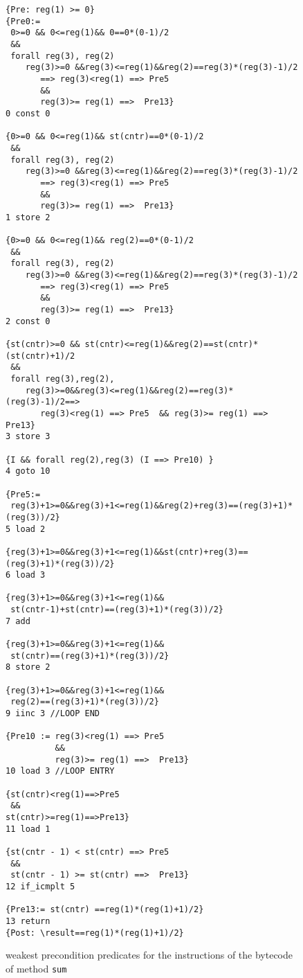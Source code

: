 \begin{figure}
{\scriptsize
\begin{lstlisting}[frame=trbl]
{Pre: reg(1) >= 0}
{Pre0:= 
 0>=0 && 0<=reg(1)&& 0==0*(0-1)/2
 && 
 forall reg(3), reg(2)
    reg(3)>=0 &&reg(3)<=reg(1)&&reg(2)==reg(3)*(reg(3)-1)/2
       ==> reg(3)<reg(1) ==> Pre5 
       &&
       reg(3)>= reg(1) ==>  Pre13}
0 const 0

{0>=0 && 0<=reg(1)&& st(cntr)==0*(0-1)/2
 && 
 forall reg(3), reg(2)
    reg(3)>=0 &&reg(3)<=reg(1)&&reg(2)==reg(3)*(reg(3)-1)/2
       ==> reg(3)<reg(1) ==> Pre5 
       &&
       reg(3)>= reg(1) ==>  Pre13}
1 store 2

{0>=0 && 0<=reg(1)&& reg(2)==0*(0-1)/2
 && 
 forall reg(3), reg(2)
    reg(3)>=0 &&reg(3)<=reg(1)&&reg(2)==reg(3)*(reg(3)-1)/2
       ==> reg(3)<reg(1) ==> Pre5 
       &&
       reg(3)>= reg(1) ==>  Pre13}
2 const 0

{st(cntr)>=0 && st(cntr)<=reg(1)&&reg(2)==st(cntr)*(st(cntr)+1)/2
 && 
 forall reg(3),reg(2), 
    reg(3)>=0&&reg(3)<=reg(1)&&reg(2)==reg(3)*(reg(3)-1)/2==> 
       reg(3)<reg(1) ==> Pre5  && reg(3)>= reg(1) ==> Pre13}
3 store 3

{I && forall reg(2),reg(3) (I ==> Pre10) }
4 goto 10

{Pre5:=
 reg(3)+1>=0&&reg(3)+1<=reg(1)&&reg(2)+reg(3)==(reg(3)+1)*(reg(3))/2}
5 load 2

{reg(3)+1>=0&&reg(3)+1<=reg(1)&&st(cntr)+reg(3)==(reg(3)+1)*(reg(3))/2}
6 load 3

{reg(3)+1>=0&&reg(3)+1<=reg(1)&&
 st(cntr-1)+st(cntr)==(reg(3)+1)*(reg(3))/2}
7 add

{reg(3)+1>=0&&reg(3)+1<=reg(1)&&
 st(cntr)==(reg(3)+1)*(reg(3))/2}
8 store 2

{reg(3)+1>=0&&reg(3)+1<=reg(1)&&
 reg(2)==(reg(3)+1)*(reg(3))/2}
9 iinc 3 //LOOP END

{Pre10 := reg(3)<reg(1) ==> Pre5 
          &&
          reg(3)>= reg(1) ==>  Pre13}
10 load 3 //LOOP ENTRY

{st(cntr)<reg(1)==>Pre5 
 &&
st(cntr)>=reg(1)==>Pre13}
11 load 1

{st(cntr - 1) < st(cntr) ==> Pre5 
 &&
 st(cntr - 1) >= st(cntr) ==>  Pre13}
12 if_icmplt 5 

{Pre13:= st(cntr) ==reg(1)*(reg(1)+1)/2}
13 return
{Post: \result==reg(1)*(reg(1)+1)/2}
\end{lstlisting} }
\caption{\sc weakest precondition predicates for the instructions of the   bytecode of method \lstinline!sum!}
\label{wp:example:sumVC}
\end{figure}







